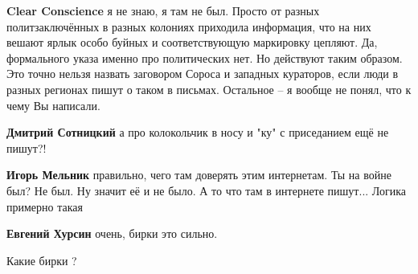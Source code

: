 \begin{itemize}
\begin{itemize}
 
\textbf{Clear Conscience} я не знаю, я там не был. Просто от разных политзаключённых в разных колониях приходила информация, что на них вешают ярлык особо буйных и соответствующую маркировку цепляют. Да, формального указа именно про политических нет. Но действуют таким образом. Это точно нельзя назвать заговором Сороса и западных кураторов, если люди в разных регионах пишут о таком в письмах. Остальное – я вообще не понял, что к чему Вы написали.

 
\textbf{Дмитрий Сотницкий} а про колокольчик в носу и "ку" с приседанием ещё не пишут?!

 
\textbf{Игорь Мельник} правильно, чего там доверять этим интернетам. Ты на войне был? Не был. Ну значит её и не было. А то что там в интернете пишут... Логика примерно такая

 
\textbf{Евгений Хурсин} очень, бирки это сильно.

 
Какие бирки ?

\end{itemize}

 

\end{itemize}
